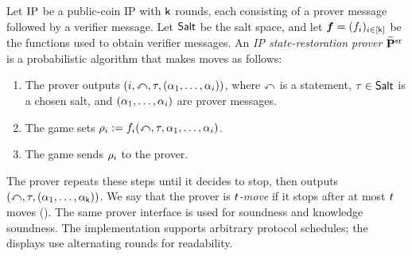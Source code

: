 \begin{definition}
  \label{def:sr_prover}
  Let \(\mathrm{IP}\) be a public-coin IP with \(\mathsf{k}\) rounds, each consisting of a prover message followed by a verifier message. Let \(\mathsf{Salt}\) be the salt space, and let \(\boldsymbol{f}=(f_{i})_{i\in[\mathsf{k}]}\) be the functions used to obtain verifier messages. An \emph{IP state-restoration prover} \(\widetilde{\mathbf P}^{\mathrm{sr}}\) is a probabilistic algorithm that makes moves as follows:
  \begin{enumerate}
    \item The prover outputs \((i,\mathbb{x},\tau,(\alpha_1,\ldots,\alpha_{i}))\), where
      \(\mathbb{x}\) is a statement, \(\tau\in\mathsf{Salt}\) is a chosen salt, and \((\alpha_1,\ldots,\alpha_{i})\) are prover messages.
    \item The game sets
      \(\rho_{i}:=f_{i}(\mathbb{x},\tau,\alpha_1,\ldots,\alpha_{i})\).
    \item The game sends \(\rho_{i}\) to the prover.
  \end{enumerate}
  The prover repeats these steps until it decides to stop, then outputs \((\mathbb{x},\tau,(\alpha_1,\ldots,\alpha_{\mathsf{k}}))\). We say that the prover is \emph{\(t\)-move} if it stops after at most \(t\) moves (). The same prover interface is used for soundness and knowledge soundness. The implementation supports arbitrary protocol schedules; the displays use alternating rounds for readability.

  \leanok
\end{definition}

